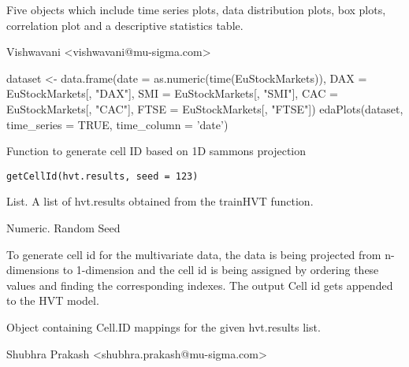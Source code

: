 \documentclass[letterpaper]{book}
\begin{document}
%
\begin{Value}
Five objects which include time series plots, data distribution plots, 
box plots, correlation plot and a descriptive statistics table.
\end{Value}
%
\begin{Author}
Vishwavani <vishwavani@mu-sigma.com>
\end{Author}
%
\begin{Examples}
\begin{ExampleCode}
dataset <- data.frame(date = as.numeric(time(EuStockMarkets)),
                      DAX = EuStockMarkets[, "DAX"],
                      SMI = EuStockMarkets[, "SMI"],
                      CAC = EuStockMarkets[, "CAC"],
                      FTSE = EuStockMarkets[, "FTSE"])
edaPlots(dataset, time_series = TRUE, time_column = 'date')
\end{ExampleCode}
\end{Examples}
%
\begin{Description}
Function to generate cell ID based on 1D sammons projection
\end{Description}
%
\begin{Usage}
\begin{verbatim}
getCellId(hvt.results, seed = 123)
\end{verbatim}
\end{Usage}
%
\begin{Arguments}
\begin{ldescription}
\item[\code{hvt.results}] List. A list of hvt.results obtained from the trainHVT function.

\item[\code{seed}] Numeric. Random Seed
\end{ldescription}
\end{Arguments}
%
\begin{Details}
To generate cell id for the multivariate data, the data is being projected from n-dimensions to 1-dimension 
and the cell id is being assigned by ordering these values and finding the corresponding indexes. The output Cell id gets
appended to the HVT model.
\end{Details}
%
\begin{Value}
Object containing Cell.ID mappings for the given hvt.results list.
\end{Value}
%
\begin{Author}
Shubhra Prakash <shubhra.prakash@mu-sigma.com>
\end{Author}
\end{document}
